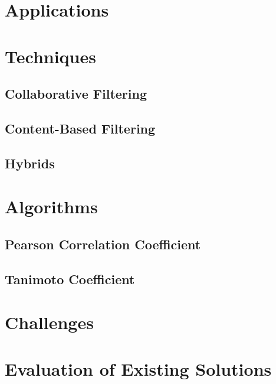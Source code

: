 \section{Applications}

\section{Techniques}

\subsection{Collaborative Filtering}
\subsection{Content-Based Filtering}
\subsection{Hybrids}

\section{Algorithms}

\subsection{Pearson Correlation Coefficient}
\subsection{Tanimoto Coefficient}

\section{Challenges}


\section{Evaluation of Existing Solutions}

